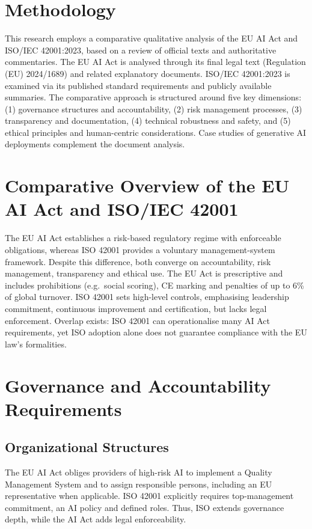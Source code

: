 \documentclass{article}
\begin{document}
\section{Methodology}
This research employs a comparative qualitative analysis of the EU AI Act and ISO/IEC 42001:2023, based on a review of official texts and authoritative commentaries. The EU AI Act is analysed through its final legal text (Regulation (EU) 2024/1689) and related explanatory documents. ISO/IEC 42001:2023 is examined via its published standard requirements and publicly available summaries. The comparative approach is structured around five key dimensions: (1) governance structures and accountability, (2) risk management processes, (3) transparency and documentation, (4) technical robustness and safety, and (5) ethical principles and human-centric considerations. Case studies of generative AI deployments complement the document analysis.

\section{Comparative Overview of the EU AI Act and ISO/IEC 42001}
The EU AI Act establishes a risk-based regulatory regime with enforceable obligations, whereas ISO 42001 provides a voluntary management-system framework. Despite this difference, both converge on accountability, risk management, transparency and ethical use. The EU Act is prescriptive and includes prohibitions (e.g.\ social scoring), CE marking and penalties of up to 6\% of global turnover. ISO 42001 sets high-level controls, emphasising leadership commitment, continuous improvement and certification, but lacks legal enforcement. Overlap exists: ISO 42001 can operationalise many AI Act requirements, yet ISO adoption alone does not guarantee compliance with the EU law’s formalities.

\section{Governance and Accountability Requirements}
\subsection{Organizational Structures}
The EU AI Act obliges providers of high-risk AI to implement a Quality Management System and to assign responsible persons, including an EU representative when applicable. ISO 42001 explicitly requires top-management commitment, an AI policy and defined roles. Thus, ISO extends governance depth, while the AI Act adds legal enforceability.
\end{document}
